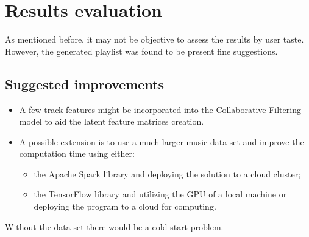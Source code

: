 \documentclass{article}
\numberwithin{equation}{section}		%
\numberwithin{figure}{section}			%
\numberwithin{table}{section}				%
\begin{document}
\section{Results evaluation}
As mentioned before, it may not be objective to assess the results by user taste. However, the generated playlist was found to be present fine suggestions.

\subsection{Suggested improvements}
\begin{itemize}
\item A few track features might be incorporated into the Collaborative Filtering model to aid the latent feature matrices creation.
\item A possible extension is to use a much larger music data set and improve the computation time using either:
\begin{itemize}
	\item the Apache Spark library and deploying the solution to a cloud cluster;
	\item the TensorFlow\cite{MatrixFactWithTensorFL} library and utilizing the GPU of a local machine or deploying the program to a cloud for computing.
\end{itemize}
\end{itemize}


Without the data set there would be a cold start problem.





\end{document}
